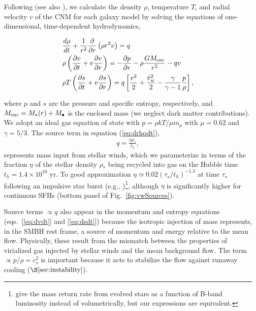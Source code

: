 \documentclass[usenatbib,fleqn]{mn2e}
\newcommand{\dxdy}[2]{\frac{d #1}{d #2} }
\newcommand{\drhodt}{\dxdy{\rho}{t}}
\newcommand{\ke}{\frac{v^2}{2}}
\newcommand{\kew}{\frac{\tilde{v}_{w}^2}{2}}
\newcommand{\gammaf}{\frac{\gamma}{\gamma-1}}
\newcommand{\cs}{\frac{p}{\rho}}
\newcommand{\rhostar}{\rho_*}
\newcommand{\Mbh}[1][]{M_{\bullet#1}}
\renewcommand{\th}{t_h}
\begin{document}
Following \citet{Quataert:2004a} (see also
\citealt{HolzerAxford:1970a,De-ColleGuillochon+:2012a,ShcherbakovWong+:2014a}),
we calculate the density $\rho$, temperature $T$, and radial velocity
$v$ of the CNM for each galaxy model by solving the equations of
one-dimensional, time-dependent hydrodynamics,

\begin{align}
  &\drhodt+\frac{1}{r^2}\frac{\partial}{\partial r}\left(\rho r^2 v\right)=q \label{eq:drhodt}\\
  &\rho \left(\frac{\partial v}{\partial t} + v\frac{\partial
      v}{\partial r}\right) =-\frac{\partial p}{\partial r}- \rho\frac{GM_{\rm enc}}{r^{2}} -q v \label{eq:dvdt}\\
  &\rho T\left(\frac{\partial s}{\partial t} + v\frac{\partial
      s}{\partial r}\right)=q\left[\ke+\kew-\gammaf \cs \right] ,
\label{eq:dsdt}
\end{align}

where $p$ and $s$ are the pressure and specific entropy, respectively,
and $M_{\rm enc} = M_{\star}(r) + \Mbh$ is the enclosed mass (we
neglect dark matter contributions).  We adopt an ideal gas equation of
state with $p = \rho kT/\mu m_p$ with $\mu = 0.62$ and $\gamma = 5/3$.  The source term in equation (\ref{eq:drhodt}),
\begin{align}
  q=\frac{\eta \rhostar}{\th},
\label{eq:q}
\end{align}
represents mass input from stellar winds, which we parameterize in
terms of the fraction $\eta$ of the stellar density $\rhostar$ being
recycled into gas on the Hubble time $\th = 1.4 \times 10^{10}$ yr.
To good approximation $\eta\simeq 0.02 (\tau_{\star}/t_h)^{-1.3}$ at
time $\tau_{\star}$ following an impulsive star burst (e.g.,
\citealt{Ciotti+91})\footnote{\citet{Ciotti+91} give the mass return
  rate from evolved stars as a function of B-band luminosity instead
  of volumetrically, but our expressions are equivalent.}, although
$\eta$ is significantly higher for continuous SFHs
(bottom panel of Fig.~\ref{fig:vwSources}).

Source terms $\propto q$ also appear in the momentum and entropy
equations (eqs.~[\ref{eq:dvdt}] and [\ref{eq:dsdt}]) because the
isotropic injection of mass represents, in the SMBH rest frame, a
source of momentum and energy relative to the mean flow.  Physically,
these result from the mismatch between the properties of virialized
gas injected by stellar winds and the mean background flow.  The term
$\propto p/\rho = c_{s}^{2}$ is important because it acts to stabilize
the flow against runaway cooling ($\S\ref{sec:instability}$).
\end{document}

